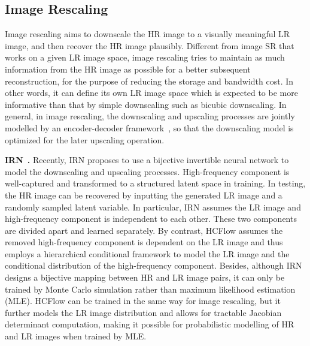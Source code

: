 \documentclass[10pt,twocolumn,letterpaper]{article}
\begin{document}
\subsection{Image Rescaling}
Image rescaling aims to downscale the HR image to a visually meaningful LR image, and then recover the HR image plausibly. Different from image SR that works on a given LR image space, image rescaling tries to maintain as much information from the HR image as possible for a better subsequent reconstruction, for the purpose of reducing the storage and bandwidth cost. In other words, it can define its own LR image space which is expected to be more informative than that by simple downscaling such as bicubic downscaling. In general, in image rescaling, the downscaling and upscaling processes are jointly modelled by an encoder-decoder framework~\cite{kim2018task, li2018learning, sun2020learned}, so that the downscaling model is optimized for the later upscaling operation.

\vspace{0.1cm}
\noindent
\textbf{IRN}~\cite{xiao2020IRN}\textbf{.}
Recently, IRN proposes to use a bijective invertible neural network to model the downscaling and upscaling processes. High-frequency component is well-captured and transformed to a structured latent space in training. In testing, the HR image can be recovered by inputting the generated LR image and a randomly sampled latent variable. In particular, IRN assumes the LR image and high-frequency component is independent to each other. These two components are divided apart and learned separately. By contrast, HCFlow assumes the removed high-frequency component is dependent on the LR image and thus employs a hierarchical conditional framework to model the LR image and the conditional distribution of the high-frequency component. Besides, although IRN designs a bijective mapping between HR and LR image pairs, it can only be trained by Monte Carlo simulation rather than maximum likelihood estimation (MLE). HCFlow can be trained in the same way for image rescaling, but it further models the LR image distribution and allows for tractable Jacobian determinant computation, making it possible for probabilistic modelling of HR and LR images when trained by MLE.
\end{document}
